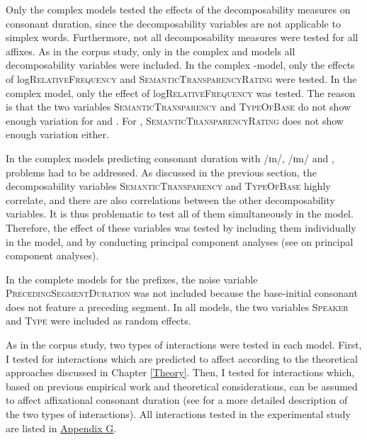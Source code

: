 Only the complex models tested the effects of the decomposability measures on consonant duration, since the decomposability variables are not applicable to simplex words.
Furthermore, not all decomposability measures were tested for all affixes. As in the corpus study, only in the complex   and models all decomposability variables were included. In the complex -model, only the effects of log\textsc{RelativeFrequency} and \textsc{SemanticTransparencyRating} were tested. In the complex model, only the effect of log\textsc{RelativeFrequency} was tested. The reason is that the two variables  \textsc{SemanticTransparency} and \textsc{TypeOfBase} do not show enough variation for  and . For , \textsc{SemanticTransparencyRating} does not show enough variation either.


In the complex models predicting consonant duration with /ɪn/, /ɪm/  and ,  problems had to be addressed. As discussed in the previous section, the decomposability variables \textsc{SemanticTransparency} and \textsc{TypeOfBase} highly correlate, and there are also correlations between the other decomposability variables. It is thus problematic to test all of them simultaneously in the model. Therefore, the effect of these variables was tested by including them individually in the model, and by conducting principal component analyses (see  on principal component analyses). 

In the complete models for the prefixes, the noise variable \textsc{PrecedingSegmentDuration} was not included because the base-initial consonant does not feature a preceding segment. In all models, the two variables \textsc{Speaker} and \textsc{Type} were included as random effects.


As in the corpus study, two types of interactions were tested in each model. First, I tested for interactions which are predicted to affect  according to the theoretical approaches discussed in Chapter \ref{Theory}. Then, I tested for interactions which, based on previous empirical work and theoretical considerations, can be assumed to affect affixational consonant duration  (see  for a more detailed description of the two types of interactions). 
 All interactions tested in the experimental study are listed in \hyperref[Appendix G Summaries of tested interactions in experimental study]{Appendix G}.

